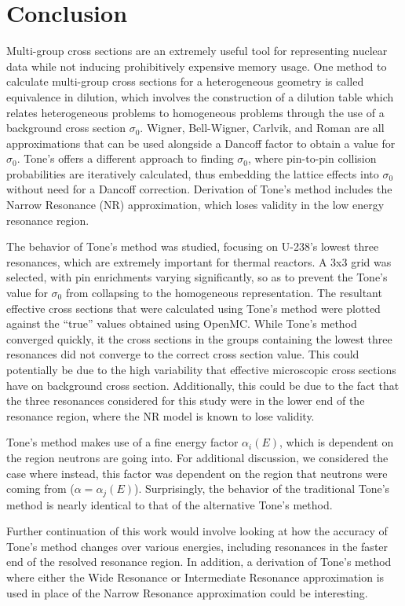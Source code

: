 \documentclass[10pt]{article}
\begin{document}
\section{Conclusion}
Multi-group cross sections are an extremely useful tool for representing nuclear data while not inducing prohibitively expensive memory usage. One method to calculate multi-group cross sections for a heterogeneous geometry is called equivalence in dilution, which involves the construction of a dilution table which relates heterogeneous problems to homogeneous problems through the use of a background cross section $\sigma_0$. Wigner, Bell-Wigner, Carlvik, and Roman are all approximations that can be used alongside a Dancoff factor to obtain a value for $\sigma_0$. Tone's offers a different approach to finding $\sigma_0$, where pin-to-pin collision probabilities are iteratively calculated, thus embedding the lattice effects into $\sigma_0$ without need for a Dancoff correction. Derivation of Tone's method includes the Narrow Resonance (NR) approximation, which loses validity in the low energy resonance region.\par
The behavior of Tone's method was studied, focusing on U-238's lowest three resonances, which are extremely important for thermal reactors. A 3x3 grid was selected, with pin enrichments varying significantly, so as to prevent the Tone's value for $\sigma_0$ from collapsing to the homogeneous representation. The resultant effective cross sections that were calculated using Tone's method were plotted against the ``true'' values obtained using OpenMC. While Tone's method converged quickly, it the cross sections in the groups containing the lowest three resonances did not converge to the correct cross section value. This could potentially be due to the high variability that effective microscopic cross sections have on background cross section. Additionally, this could be due to the fact that the three resonances considered for this study were in the lower end of the resonance region, where the NR model is known to lose validity. \par
Tone's method makes use of a fine energy factor $\alpha_i(E)$, which is dependent on the region neutrons are going into. For additional discussion, we considered the case where instead, this factor was dependent on the region that neutrons were coming from ($\alpha=\alpha_j(E)$). Surprisingly, the behavior of the traditional Tone's method is nearly identical to that of the alternative Tone's method.\par
Further continuation of this work would involve looking at how the accuracy of Tone's method changes over various energies, including resonances in the faster end of the resolved resonance region. In addition, a derivation of Tone's method where either the Wide Resonance or Intermediate Resonance approximation is used in place of the Narrow Resonance approximation could be interesting. 









  

\end{document}
